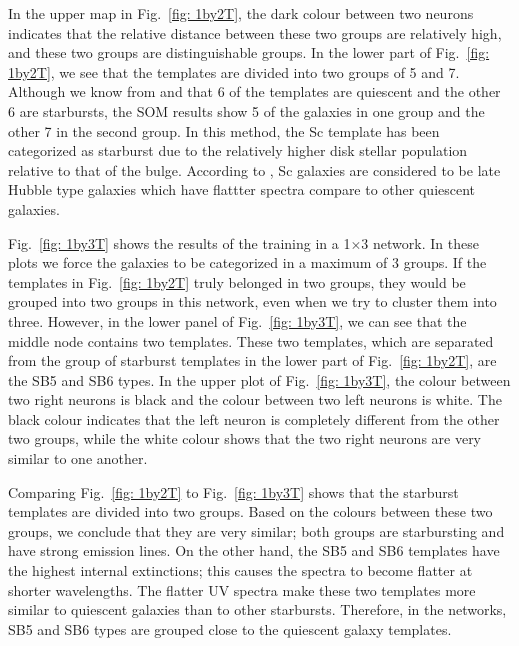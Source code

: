         
            In the upper map in Fig.~\ref{fig: 1by2T}, the dark colour between two neurons indicates that the relative distance between these two groups are relatively high, and these two groups are distinguishable groups.
            In the lower part of Fig.~\ref{fig: 1by2T}, we see that the templates are divided into two groups of 5 and 7.
            Although we know from  and  that 6 of the templates are quiescent and the other 6 are starbursts, the SOM results show 5 of the galaxies in one group and the other 7 in the second group.
            In this method, the Sc template has been categorized as starburst due to the relatively higher disk stellar population relative to that of the bulge. 
            According to , Sc galaxies are considered to be late Hubble type galaxies which have  flattter spectra compare to other quiescent galaxies. 
            

            Fig.~\ref{fig: 1by3T} shows the results of the training in a 1$\times$3 network.
            In these plots we force the galaxies to be categorized in a maximum of 3 groups. 
            If the templates in Fig.~\ref{fig: 1by2T} truly belonged in two groups, they would be grouped into two groups in this network, even when we try to cluster them into three. 
            However, in the lower panel of Fig.~\ref{fig: 1by3T}, we can see that the middle node contains two templates.
            These two templates, which are separated from the group of starburst templates in the lower part of Fig.~\ref{fig: 1by2T},  are the SB5 and SB6 types.
            In the upper plot of Fig.~\ref{fig: 1by3T}, the colour between two right neurons is black and the colour between two left neurons is white. 
            The black colour indicates that the left neuron is completely different from the other two groups,
            while the white colour shows that the two right neurons are very similar to one another. 
            
            Comparing Fig.~\ref{fig: 1by2T} to Fig.~\ref{fig: 1by3T} shows that the starburst templates are divided into two groups. 
            Based on the colours between these two groups, we conclude that they are very similar; both groups are starbursting and have strong emission lines.
            On the other hand, the SB5 and SB6 templates have the highest internal extinctions; this causes the spectra to become flatter at shorter wavelengths. 
            The flatter UV spectra make these two templates more similar to quiescent galaxies than to other starbursts.
            Therefore, in the networks, SB5 and SB6 types are grouped close to the quiescent galaxy templates.
                
